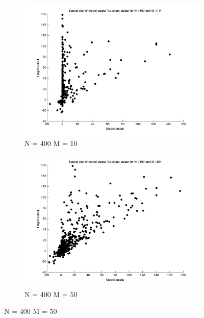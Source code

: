 \documentclass{article}
\begin{document}
\begin{figure}[H]

\begin{subfigure}{.5\textwidth}
\centering
\includegraphics[width=\linewidth]{D2/Scatter/VaryingM_N400M10}	
\caption{N = 400 M = 10}
\end{subfigure}
\begin{subfigure}{.5\textwidth}
\includegraphics[width=\linewidth]{D2/Scatter/VaryingM_N400M50}
\caption{N = 400 M = 50}
\end{subfigure}



\end{figure}
\end{document}
